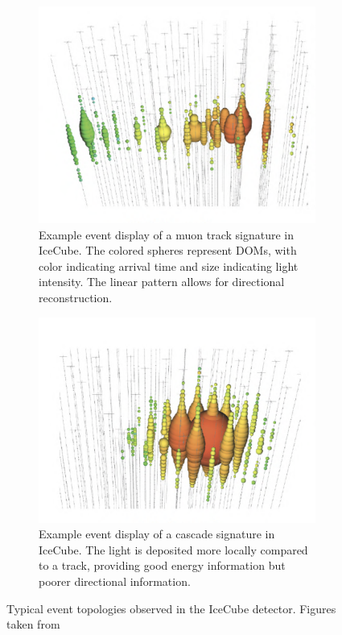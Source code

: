 \begin{figure}[H]
    \centering
    \begin{subfigure}{0.48\textwidth}
        \centering
        \includegraphics[width=\textwidth]{Figures/Track.png}
        \caption{Example event display of a muon track signature in IceCube. The colored spheres represent DOMs, with color indicating arrival time and size indicating light intensity. The linear pattern allows for directional reconstruction.}
        \label{fig:Track_event}
    \end{subfigure}
    \hfill
    \begin{subfigure}{0.48\textwidth}
        \centering
        \includegraphics[width=\textwidth]{Figures/Cascade.png}
        \caption{Example event display of a cascade signature in IceCube. The light is deposited more locally compared to a track, providing good energy information but poorer directional information.}
        \label{fig:Cascade_event}
    \end{subfigure}
    \caption{Typical event topologies observed in the IceCube detector. Figures taken from \citet{Kowalski_2017}}
    \label{fig:Event_topologies}
\end{figure}


